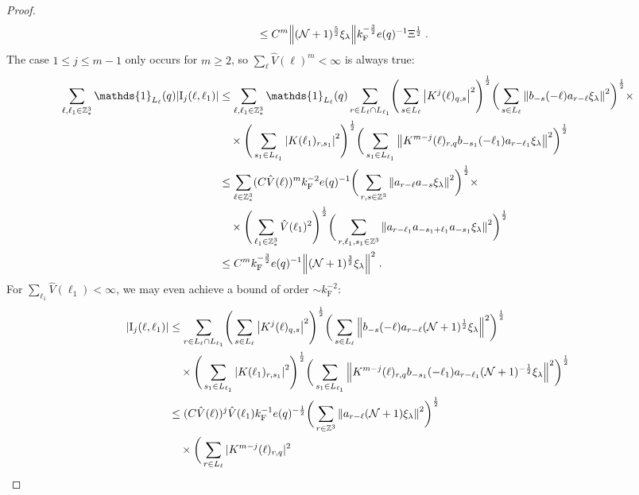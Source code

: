 \documentclass[12pt,a4paper]{article}
\numberwithin{equation}{section}
\newcommand{\1}{\mathbb{I}}
\newcommand{\F}{\mathrm{F}}
\newcommand{\I}{\mathrm{I}}
\newcommand{\Z}{\mathbb{Z}}
\newcommand{\NN}{\mathcal{N}}
\newcommand{\half}{\frac{1}{2}}
\theoremstyle{plain}
\theoremstyle{definition}
\theoremstyle{remark}
\theoremstyle{plain}
\theoremstyle{definition}
\theoremstyle{remark}
\begin{document}
\begin{proof}
\begin{align}
 	&\leq C^m \norm{ (\NN+1)^{\frac 52}\xi_\lambda}
 		k_{\F}^{-\frac 32} e(q)^{-1} \Xi^{\half} \;. \label{eq:estEQ2111} 
\end{align}
The case $ 1 \le j \le m-1 $ only occurs for $ m \ge 2 $, so $ \sum_\ell \hat{V}(\ell)^m < \infty $ is always true:
\begin{align}
	\sum_{\ell,\ell_1 \in \Z^3_*} \mathds{1}_{L_\ell}(q) |\I_j(\ell, \ell_1)|
	&\leq \sum_{\ell,\ell_1 \in \Z^3_*} \mathds{1}_{L_\ell}(q) \sum\limits_{r\in L_{\ell} \cap L_{\ell_1}}\! \Bigg( \sum\limits_{s \in L_\ell} \abs{K^{j}(\ell)_{q,s}}^2\Bigg)^\half \bigg( \sum\limits_{s \in L_\ell}\norm{b_{-s}(-\ell) a_{r-\ell} \xi_\lambda}^2\bigg)^\half \times\nonumber\\
		&\quad \times \Bigg( \sum\limits_{s_1 \in L_{\ell_1}}\abs{K(\ell_1)_{r,s_1}}^2\Bigg)^\half \bigg(\sum\limits_{s_1 \in L_{\ell_1}}\norm{ K^{m-j}(\ell)_{r,q} b_{-s_1}(-\ell_1)  a_{r-\ell_1} \xi_\lambda }^2\bigg)^\half
	\nonumber\\
	&\leq \sum_{\ell \in \Z^3_*} (C \hat{V}(\ell))^m
		k_{\F}^{-2} e(q)^{-1}
		\bigg( \sum\limits_{r, s\in \Z^3} \norm{ a_{r-\ell} a_{-s} \xi_\lambda}^2\bigg)^\half \times \nonumber\\
		&\quad \times 
		\Bigg( \sum_{\ell_1 \in \Z^3_*} \hat{V}(\ell_1)^2 \Bigg)^{\half}
	\bigg(
		\sum\limits_{r, \ell_1, s_1 \in \Z^3} \norm{ a_{r-\ell_1} a_{-s_1 + \ell_1} a_{-s_1} \xi_\lambda }^2\bigg)^\half
	\nonumber\\
	&\leq C^m k_{\F}^{-\frac 32} e(q)^{-1}
	\norm{ (\NN+1)^{\frac 32} \xi_\lambda}^2 \;. \label{eq:estEQ2112_Coulomb}
\end{align}
For $ \sum_{\ell_1} \hat{V}(\ell_1) < \infty $, we may even achieve a bound of order $ \sim k_{\F}^{-2} $:
\begin{align}
	|\I_j(\ell, \ell_1)|
	&\leq \sum_{r\in L_{\ell} \cap L_{\ell_1}}\! \Bigg( \sum_{s \in L_\ell} \abs{K^{j}(\ell)_{q,s}}^2\Bigg)^\half \bigg( \sum_{s \in L_\ell}\norm{b_{-s}(-\ell) a_{r-\ell} (\NN+1)^{\half}\xi_\lambda}^2\bigg)^\half \nonumber\\
		&\quad \times \Bigg( \sum_{s_1 \in L_{\ell_1}}\abs{K(\ell_1)_{r,s_1}}^2\Bigg)^\half \bigg(\sum_{s_1 \in L_{\ell_1}}\norm{ K^{m-j}(\ell)_{r,q} b_{-s_1}(-\ell_1)  a_{r-\ell_1} (\NN+1)^{-\half}\xi_\lambda }^2\bigg)^\half
	\nonumber\\
	&\leq (C \hat{V}(\ell))^j \hat{V}(\ell_1) k_{\F}^{-1} e(q)^{-\half}
	\bigg( \sum_{r\in \Z^3} \norm{ a_{r-\ell} (\NN+1) \xi_\lambda}^2\bigg)^\half  \nonumber\\
		&\quad \times 
	\bigg(\sum_{r\in L_{\ell}} |K^{m-j}(\ell)_{r,q} |^2

\end{align}
\end{proof}
\end{document}
